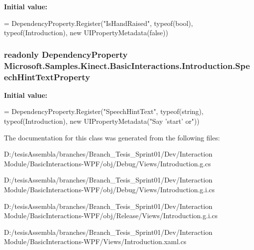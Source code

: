 {\bfseries Initial value\-:}
\begin{DoxyCode}
=
            DependencyProperty.Register(\textcolor{stringliteral}{"IsHandRaised"}, typeof(\textcolor{keywordtype}{bool}), typeof(Introduction), \textcolor{keyword}{new} 
      UIPropertyMetadata(\textcolor{keyword}{false}))
\end{DoxyCode}
\hypertarget{class_microsoft_1_1_samples_1_1_kinect_1_1_basic_interactions_1_1_introduction_a0807487eef30a2b9375544bf14e189ec}{
\subsubsection[{Speech\-Hint\-Text\-Property}]{\setlength{\rightskip}{0pt plus 5cm}readonly Dependency\-Property Microsoft.\-Samples.\-Kinect.\-Basic\-Interactions.\-Introduction.\-Speech\-Hint\-Text\-Property\hspace{0.3cm}{\ttfamily [static]}}}\label{class_microsoft_1_1_samples_1_1_kinect_1_1_basic_interactions_1_1_introduction_a0807487eef30a2b9375544bf14e189ec}
{\bfseries Initial value\-:}
\begin{DoxyCode}
=
            DependencyProperty.Register(\textcolor{stringliteral}{"SpeechHintText"}, typeof(\textcolor{keywordtype}{string}), typeof(Introduction), \textcolor{keyword}{new} 
      UIPropertyMetadata(\textcolor{stringliteral}{"Say 'start' or"}))
\end{DoxyCode}


The documentation for this class was generated from the following files\-:\begin{DoxyCompactItemize}
\item 
D\-:/tesis\-Assembla/branches/\-Branch\-\_\-\-Tesis\-\_\-\-Sprint01/\-Dev/\-Interaction Module/\-Basic\-Interactions-\/\-W\-P\-F/obj/\-Debug/\-Views/Introduction.\-g.\-cs\item 
D\-:/tesis\-Assembla/branches/\-Branch\-\_\-\-Tesis\-\_\-\-Sprint01/\-Dev/\-Interaction Module/\-Basic\-Interactions-\/\-W\-P\-F/obj/\-Debug/\-Views/Introduction.\-g.\-i.\-cs\item 
D\-:/tesis\-Assembla/branches/\-Branch\-\_\-\-Tesis\-\_\-\-Sprint01/\-Dev/\-Interaction Module/\-Basic\-Interactions-\/\-W\-P\-F/obj/\-Release/\-Views/Introduction.\-g.\-i.\-cs\item 
D\-:/tesis\-Assembla/branches/\-Branch\-\_\-\-Tesis\-\_\-\-Sprint01/\-Dev/\-Interaction Module/\-Basic\-Interactions-\/\-W\-P\-F/\-Views/Introduction.\-xaml.\-cs\end{DoxyCompactItemize}
